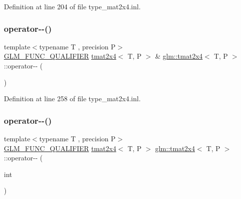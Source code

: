 Definition at line 204 of file type\+\_\+mat2x4.\+inl.

\mbox{\label{structglm_1_1tmat2x4_aafc4d25fe4f906a6e8ef4b7f90f7ff43}} 
\subsubsection{\texorpdfstring{operator-\/-\/()}{operator--()}\hspace{0.1cm}{\footnotesize\ttfamily [1/2]}}
{\footnotesize\ttfamily template$<$typename T , precision P$>$ \\
\mbox{\hyperlink{setup_8hpp_a33fdea6f91c5f834105f7415e2a64407}{G\+L\+M\+\_\+\+F\+U\+N\+C\+\_\+\+Q\+U\+A\+L\+I\+F\+I\+ER}} \mbox{\hyperlink{structglm_1_1tmat2x4}{tmat2x4}}$<$ T, P $>$ \& \mbox{\hyperlink{structglm_1_1tmat2x4}{glm\+::tmat2x4}}$<$ T, P $>$\+::operator-\/-\/ (\begin{DoxyParamCaption}{ }\end{DoxyParamCaption})}



Definition at line 258 of file type\+\_\+mat2x4.\+inl.

\mbox{\label{structglm_1_1tmat2x4_ac1f8d36996a11d5fcf0d1ff29b254ba6}} 
\subsubsection{\texorpdfstring{operator-\/-\/()}{operator--()}\hspace{0.1cm}{\footnotesize\ttfamily [2/2]}}
{\footnotesize\ttfamily template$<$typename T , precision P$>$ \\
\mbox{\hyperlink{setup_8hpp_a33fdea6f91c5f834105f7415e2a64407}{G\+L\+M\+\_\+\+F\+U\+N\+C\+\_\+\+Q\+U\+A\+L\+I\+F\+I\+ER}} \mbox{\hyperlink{structglm_1_1tmat2x4}{tmat2x4}}$<$ T, P $>$ \mbox{\hyperlink{structglm_1_1tmat2x4}{glm\+::tmat2x4}}$<$ T, P $>$\+::operator-\/-\/ (\begin{DoxyParamCaption}\item[{int}]{ }\end{DoxyParamCaption})}



